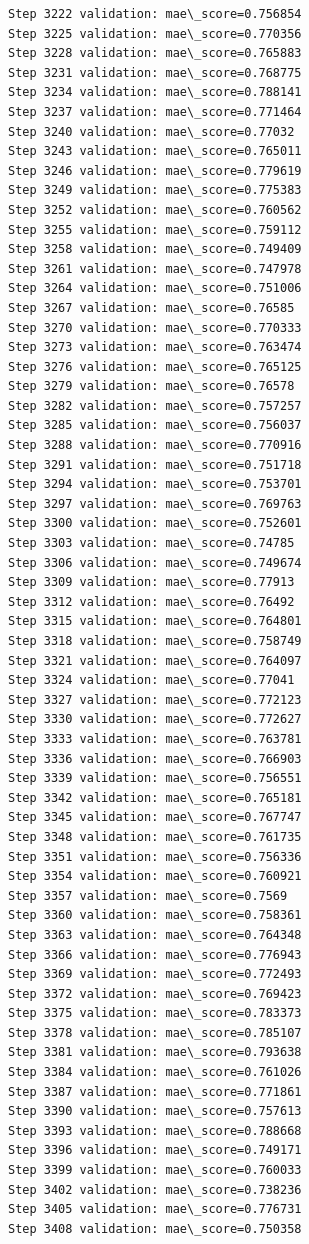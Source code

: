 \documentclass[11pt]{article}
\begin{document}
\begin{Verbatim}[commandchars=\\\{\}]
Step 3222 validation: mae\_score=0.756854
Step 3225 validation: mae\_score=0.770356
Step 3228 validation: mae\_score=0.765883
Step 3231 validation: mae\_score=0.768775
Step 3234 validation: mae\_score=0.788141
Step 3237 validation: mae\_score=0.771464
Step 3240 validation: mae\_score=0.77032
Step 3243 validation: mae\_score=0.765011
Step 3246 validation: mae\_score=0.779619
Step 3249 validation: mae\_score=0.775383
Step 3252 validation: mae\_score=0.760562
Step 3255 validation: mae\_score=0.759112
Step 3258 validation: mae\_score=0.749409
Step 3261 validation: mae\_score=0.747978
Step 3264 validation: mae\_score=0.751006
Step 3267 validation: mae\_score=0.76585
Step 3270 validation: mae\_score=0.770333
Step 3273 validation: mae\_score=0.763474
Step 3276 validation: mae\_score=0.765125
Step 3279 validation: mae\_score=0.76578
Step 3282 validation: mae\_score=0.757257
Step 3285 validation: mae\_score=0.756037
Step 3288 validation: mae\_score=0.770916
Step 3291 validation: mae\_score=0.751718
Step 3294 validation: mae\_score=0.753701
Step 3297 validation: mae\_score=0.769763
Step 3300 validation: mae\_score=0.752601
Step 3303 validation: mae\_score=0.74785
Step 3306 validation: mae\_score=0.749674
Step 3309 validation: mae\_score=0.77913
Step 3312 validation: mae\_score=0.76492
Step 3315 validation: mae\_score=0.764801
Step 3318 validation: mae\_score=0.758749
Step 3321 validation: mae\_score=0.764097
Step 3324 validation: mae\_score=0.77041
Step 3327 validation: mae\_score=0.772123
Step 3330 validation: mae\_score=0.772627
Step 3333 validation: mae\_score=0.763781
Step 3336 validation: mae\_score=0.766903
Step 3339 validation: mae\_score=0.756551
Step 3342 validation: mae\_score=0.765181
Step 3345 validation: mae\_score=0.767747
Step 3348 validation: mae\_score=0.761735
Step 3351 validation: mae\_score=0.756336
Step 3354 validation: mae\_score=0.760921
Step 3357 validation: mae\_score=0.7569
Step 3360 validation: mae\_score=0.758361
Step 3363 validation: mae\_score=0.764348
Step 3366 validation: mae\_score=0.776943
Step 3369 validation: mae\_score=0.772493
Step 3372 validation: mae\_score=0.769423
Step 3375 validation: mae\_score=0.783373
Step 3378 validation: mae\_score=0.785107
Step 3381 validation: mae\_score=0.793638
Step 3384 validation: mae\_score=0.761026
Step 3387 validation: mae\_score=0.771861
Step 3390 validation: mae\_score=0.757613
Step 3393 validation: mae\_score=0.788668
Step 3396 validation: mae\_score=0.749171
Step 3399 validation: mae\_score=0.760033
Step 3402 validation: mae\_score=0.738236
Step 3405 validation: mae\_score=0.776731
Step 3408 validation: mae\_score=0.750358

\end{Verbatim}
\end{document}
